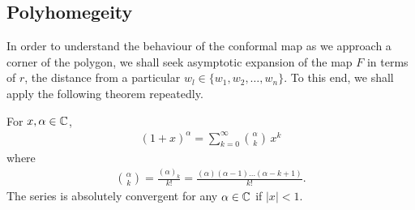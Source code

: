 \subsection{Polyhomegeity} 
In order to understand the behaviour of the conformal map as we approach a corner of the polygon, we shall seek asymptotic expansion of the map $F$ in terms of $r$, the distance from a particular $w_l \in \{w_1, w_2, \dots, w_n\}$. To this end, we shall apply the following theorem repeatedly. 

\begin{theorem} \label{thm: generalised binomial theorem}
For $x, \alpha \in \mathbb C$, 
\begin{align*}
(1 + x)^\alpha = \sum_{k = 0}^\infty {\alpha \choose k} \, x^k
\end{align*}
where 
\begin{align*}
{\alpha \choose k } = \frac{(\alpha)_k}{k!} = \frac{(\alpha) (\alpha - 1) \dots (\alpha -k + 1)}{k !}.
\end{align*}
The series is absolutely convergent for any $\alpha \in \mathbb C$ if $|x| < 1$. 
\end{theorem}


